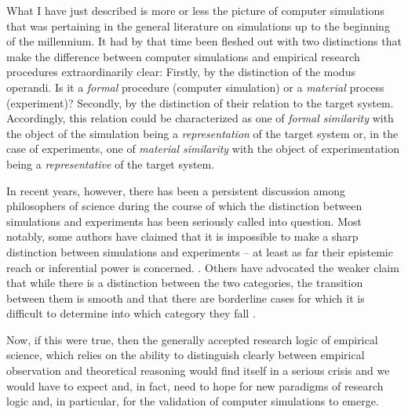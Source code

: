 \documentclass[12pt, a4paper]{article}
\begin{document}
What I have just described is more or less the picture of computer
simulations that was pertaining in the general literature on
simulations up to the beginning of the millennium. It had by that time
been fleshed out with two distinctions that make the difference
between computer simulations and empirical research procedures
extraordinarily clear: Firstly, by the distinction of the modus
operandi. Is it a {\em formal} procedure (computer simulation) or a
{\em material} process (experiment)? Secondly, by the distinction of
their relation to the target system. Accordingly, this relation could
be characterized as one of {\em formal similarity} \citep{guala:2002}
with the object of the simulation being a {\em representation}
\citep{morgan:2003} of the target system or, in the case of
experiments, one of {\em material similarity} with the object of
experimentation being a {\em representative} of the target system.

In recent years, however, there has been a persistent discussion among
philosophers of science during the course of which the distinction
between simulations and experiments has been seriously called into
question. Most notably, some authors have claimed that it is
impossible to make a sharp distinction between simulations and
experiments -- at least as far their epistemic reach or inferential
power is concerned. \citep{winsberg:2009, parker:2009, morrison:2009,
winsberg:2015}. Others have advocated the weaker claim that while
there is a distinction between the two categories, the transition
between them is smooth and that there are borderline cases for which
it is difficult to determine into which category they fall
\citep{morgan:2003}.

Now, if this were true, then the generally accepted research logic of
empirical science, which relies on the ability to distinguish clearly
between empirical observation and theoretical reasoning would find
itself in a serious crisis and we would have to expect and, in fact,
need to hope for new paradigms of research logic and, in particular,
for the validation of computer simulations to emerge.
\end{document}
